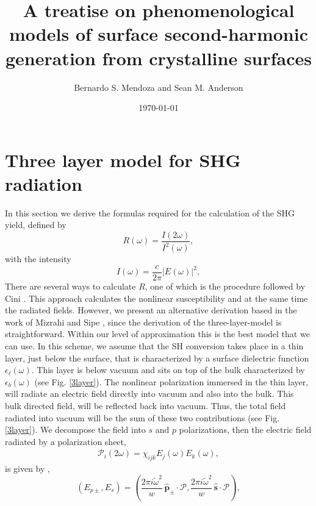 \documentclass[10pt]{article}
\title{A treatise on phenomenological models of surface second-harmonic
generation from crystalline surfaces}
\author{Bernardo S. Mendoza and Sean M. Anderson}
\date{\today}
\begin{document}
\maketitle

\section{Three layer model for SHG radiation}

In this section we derive the formulas required for the calculation of the SHG
yield, defined by
\begin{equation*}\label{uno}
R(\omega)=\frac{I(2\omega)}{I^2(\omega)}
,
\end{equation*}
with the intensity
\begin{equation*}\label{dos}
I(\omega)=\frac{c}{2\pi}|E(\omega)|^2
,
\end{equation*}
There are several ways to calculate $R$, one of which is the procedure followed
by Cini \cite{ciniPRB91}. This approach calculates the nonlinear susceptibility
and at the same time the radiated fields. However, we present an alternative
derivation based in the work of Mizrahi and Sipe \cite{mizrahiJOSA88}, since
the derivation of the three-layer-model is straightforward. Within our level of
approximation this is the best model that we can use. In this scheme, we assume
that the SH conversion takes place in a thin layer, just below the surface,
that is characterized by a surface dielectric function
$\epsilon_{\ell}(\omega)$. This layer is below vacuum and sits on top of the
bulk characterized by $\epsilon_{b}(\omega)$ (see Fig. \ref{3layer}). The
nonlinear polarization immersed in the thin layer, will radiate an electric
field directly into vacuum and also into the bulk. This bulk directed field,
will be reflected back into vacuum. Thus, the total field radiated into vacuum
will be the sum of these two contributions (see Fig. \ref{3layer}). We
decompose the field into $s$ and $p$ polarizations, then the electric field
radiated by a polarization sheet,
\begin{align}\label{tres}
\mathcal{P}_i(2\omega)=\chi_{ijk}E_{j}(\omega)E_{k}(\omega)
,
\end{align}
is given by \cite{mizrahiJOSA88},
\begin{equation*}\label{r2}
(E_{p\pm},E_s) = 
(\frac{2\pi i\tilde{\omega}^2}{w}
\,\hat{\mathbf{p}}_\pm\cdot\boldsymbol{\mathcal{P}},
\frac{2\pi i\tilde{\omega}^2}{w}
\,\hat{\mathbf{s}}\cdot\boldsymbol{\mathcal{P}}),
\end{equation*}
\end{document}
